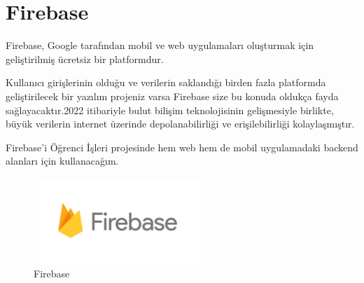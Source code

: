 \section{Firebase}
Firebase, Google tarafından mobil ve web uygulamaları oluşturmak için geliştirilmiş ücretsiz bir platformdur.

Kullanıcı girişlerinin olduğu ve verilerin saklandığı birden fazla platformda geliştirilecek bir yazılım projeniz varsa Firebase size bu konuda oldukça fayda sağlayacaktır.2022 itibariyle bulut bilişim teknolojisinin gelişmesiyle birlikte, büyük verilerin internet üzerinde depolanabilirliği ve erişilebilirliği kolaylaşmıştır.

Firebase'i Öğrenci İşleri projesinde hem web hem de mobil uygulamadaki backend alanları için kullanacağım.

\begin{figure} [h]
 \centering
 \includegraphics[width=180pt,keepaspectratio=true]{./fig/Firebase}
  \caption{Firebase}
 \label{fig:ch3-3}
\end{figure}